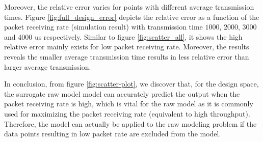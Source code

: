 Moreover, the relative error varies for points with different average transmission times. Figure \ref{fig:full_design_error} depicts the relative error as a function of the packet receiving rate (simulation result) with transmission time $1000$, $2000$, $3000$ and $4000$ us respectively. Similar to figure  \ref{fig:scatter_all}, it shows the high relative error mainly exists for low packet receiving rate. Moreover, the results reveals the smaller average transmission time results in less relative error than larger average transmission.
 



In conclusion, from figure \ref{fig:scatter-plot}, we discover that, for the design space, the surrogate \gls{raw} model model can accurately predict the output when the packet receiving rate is high, which is vital for the \gls{raw} model as it is commonly used for maximizing the packet receiving rate (equivalent to high throughput). Therefore, the model can actually be applied to the \gls{raw} modeling problem if the data points resulting in low packet rate are excluded from the model.

